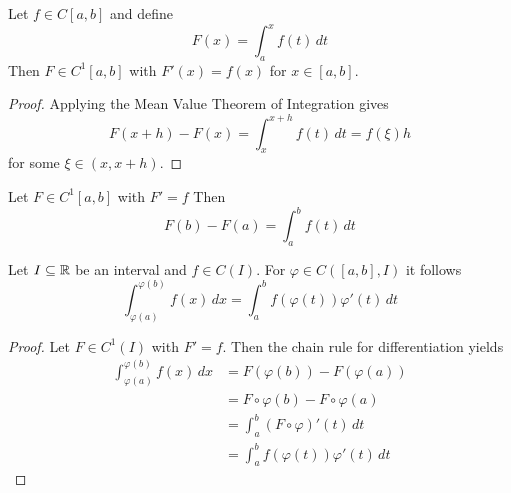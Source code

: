 \begin{theorem}\label{thm:differentiation}
    Let \( f \in C[a,b] \) and define
    \[
        F(x) = \int_a^x f(t)\,dt
    \]
    Then \( F \in C^1[a,b] \) with \( F'(x) = f(x) \) for \( x \in [a,b] \).
\end{theorem}

\begin{proof}
    Applying the Mean Value Theorem of Integration gives
    \[
        F(x + h) - F(x) =  \int_x^{x + h} f(t)\,dt = f(\xi) h
    \]
    for some \( \xi \in (x, x + h) \).
\end{proof}
\bigskip

\begin{theorem}\label{thm:fund_calculus}
    Let \( F \in C^1[a,b] \) with \( F' = f \)  Then
    \[
        F(b) -F(a) = \int_a^b f(t)\,dt
    \]
\end{theorem}
\bigskip


\begin{lemma}
    Let \( I \subseteq \mathbb{R} \) be an interval and \( f \in C(I) \). For \( \varphi \in C([a,b], I) \) it follows
    \[
        \int_{\varphi(a)}^{\varphi(b)} f(x)\,dx = \int_{a}^{b} f(\varphi(t))\varphi'(t)\,dt
    \]
\end{lemma}
\begin{proof}
    Let \( F \in C^1(I) \) with \( F' = f \). Then the chain rule for differentiation yields
    \[
        \begin{split}
            \int_{\varphi(a)}^{\varphi(b)} f(x)\,dx
            &= F(\varphi(b)) - F(\varphi(a)) \\
            &= F\circ\varphi(b) - F\circ\varphi(a) \\
            &= \int_{a}^{b} (F\circ\varphi)'(t)\,dt \\
            &= \int_{a}^{b} f(\varphi(t))\varphi'(t)\,dt
        \end{split}
    \]
\end{proof}
\bigskip

